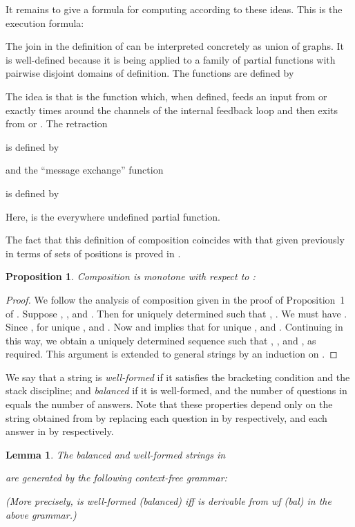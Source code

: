 \documentclass[11pt]{article}
\newtheorem{lemma}[theorem]{Lemma}
\newtheorem{proposition}[theorem]{Proposition}
\begin{document}
It remains to give a formula for computing  according to these
ideas.  This is the execution formula:

The join in the definition of  can be interpreted concretely as union of
graphs.  It is well-defined because it is being applied to a family of
partial functions with pairwise disjoint domains of definition.  The
functions  are defined by

The idea is that  is the function which, when
defined, feeds an input from  or  exactly  times around
the channels of the internal feedback loop and then exits from  or
.  The retraction

is defined by

and the ``message exchange'' function

is defined by

Here,  is the everywhere undefined partial function.

The fact that this definition of composition coincides with that given
previously in terms
of sets of positions is proved in \cite[Proposition~3]{AbramskyS:gamfcm}.


\begin{proposition}
Composition is monotone with respect to :
  
\end{proposition}

\begin{proof}  We follow the analysis of composition given in the
proof of Proposition~1 of \cite{AbramskyS:gamfcm}. Suppose , ,  and
. Then  for uniquely determined  such that , . We must have . Since ,  for unique , and . Now  and  implies that  for unique
, and . Continuing in this
way, we obtain a uniquely determined sequence  such that , , and , as required. This argument is
extended to general strings  by an induction
on . 
\end{proof}

We say that a string  is
{\em well-formed}
if it satisfies the bracketing condition and the stack discipline; and
{\em balanced} if it is well-formed, and the number of questions in 
equals the number of answers.
Note that these properties depend only on the string  obtained from 
by replacing each question in  by
 respectively, and each answer in  by  respectively.

\begin{lemma}
The balanced and well-formed strings in

are generated by the following context-free grammar:


(More precisely,  is well-formed (balanced) iff  is derivable from
{\sc wf} ({\sc bal}) in the above grammar.)
\end{lemma}
\end{document}
